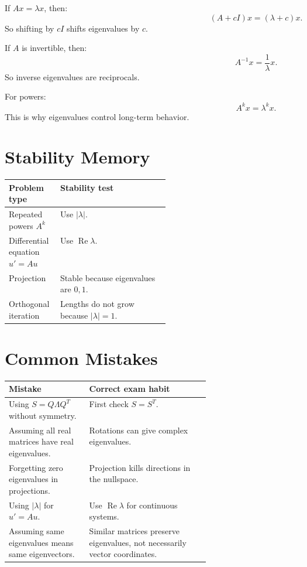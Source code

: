 \documentclass[10pt]{article}
\begin{document}
If \(Ax=\lambda x\), then:
\[
(A+cI)x=(\lambda+c)x.
\]
So shifting by \(cI\) shifts eigenvalues by \(c\).

If \(A\) is invertible, then:
\[
A^{-1}x=\frac{1}{\lambda}x.
\]
So inverse eigenvalues are reciprocals.

For powers:
\[
A^{k}x=\lambda^{k}x.
\]
This is why eigenvalues control long-term behavior.

\section{Stability Memory}

\begin{center}
\small
\begin{tabularx}{\linewidth}{@{}L{0.32\linewidth}Y@{}}
\toprule
Problem type & Stability test \\
\midrule
Repeated powers \(A^k\) & Use \(|\lambda|\). \\
Differential equation \(u'=Au\) & Use \(\operatorname{Re}\lambda\). \\
Projection & Stable because eigenvalues are \(0,1\). \\
Orthogonal iteration & Lengths do not grow because \(|\lambda|=1\). \\
\bottomrule
\end{tabularx}
\end{center}

\section{Common Mistakes}

\begin{center}
\small
\begin{tabularx}{\linewidth}{@{}L{0.40\linewidth}Y@{}}
\toprule
Mistake & Correct exam habit \\
\midrule
Using \(S=Q\Lambda Q^{T}\) without symmetry. & First check \(S=S^{T}\). \\
Assuming all real matrices have real eigenvalues. & Rotations can give complex eigenvalues. \\
Forgetting zero eigenvalues in projections. & Projection kills directions in the nullspace. \\
Using \(|\lambda|\) for \(u'=Au\). & Use \(\operatorname{Re}\lambda\) for continuous systems. \\
Assuming same eigenvalues means same eigenvectors. & Similar matrices preserve eigenvalues, not necessarily vector coordinates. \\
\bottomrule
\end{tabularx}
\end{center}
\end{document}
